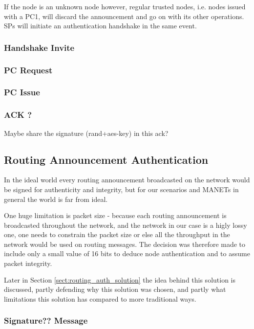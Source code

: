 If the node is an unknown node however, regular trusted nodes, i.e. nodes issued
with a \ac{PC1}, will discard the announcement and go on with its other
operations. \acp{SP} will initiate an authentication handshake in the same
event.

\subsubsection*{Handshake Invite}

\subsubsection*{\acf{PC} Request}

\subsubsection*{\acf{PC} Issue}

\subsubsection*{ACK ?}
Maybe share the signature (rand+aes-key) in this ack?



\subsection{Routing Announcement Authentication}
In the ideal world every routing announcement broadcasted on the network would
be signed for authenticity and integrity, but for our scenarios and \acp{MANET}
in general the world is far from ideal.

One huge limitation is packet size - because each routing announcement is
broadcasted throughout the network, and the network in our case is a higly lossy
one, one needs to constrain the packet size or else all the throughput in the
network would be used on routing messages. The decision was therefore made to
include only a small value of 16 bits to deduce node authentication and to
assume packet integrity.

Later in Section \ref{sect:routing_auth_solution} the idea  behind this
solution is discussed, partly defending why this solution was chosen, and partly
what limitations this solution has compared to more traditional ways.

\subsubsection*{Signature?? Message}


